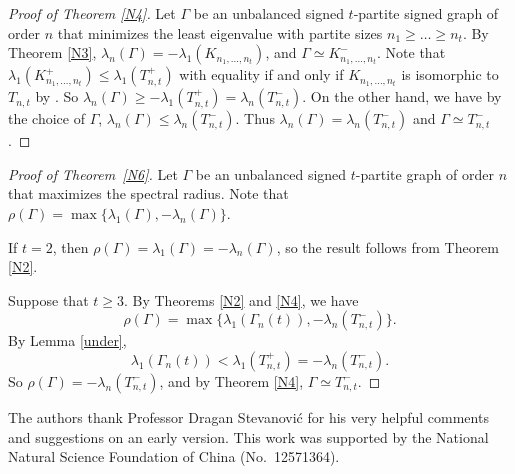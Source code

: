 \documentclass[12pt]{article}
\numberwithin{equation}{section}
\begin{document}
\begin{proof}[Proof of Theorem \ref{N4}]
Let $\Gamma$ be an unbalanced signed $t$-partite signed graph of order $n$ that minimizes the least eigenvalue with partite sizes $n_1\ge \dots\ge n_t$. 
By Theorem \ref{N3}, $\lambda_n(\Gamma)=-\lambda_1(K_{n_1, \dots, n_t})$, and $\Gamma\simeq K_{n_1, \dots, n_t}^-$. 
Note that $\lambda_1(K_{n_1, \dots, n_t}^+)\le \lambda_1(T_{n, t}^+)$ with equality if and only if $K_{n_1, \dots, n_t}$ is isomorphic to $T_{n, t}$ by \cite{SGR}.
So $\lambda_n(\Gamma)\ge -\lambda_1(T_{n, t}^+)=\lambda_n(T_{n, t}^-)$. On the other hand, we have by the choice of $\Gamma$,  $\lambda_n(\Gamma)\le \lambda_n(T_{n, t}^-)$.
Thus $\lambda_n(\Gamma)=\lambda_n(T_{n, t}^-)$ and $\Gamma\simeq T_{n, t}^-$.
\end{proof}




\begin{proof}[Proof of Theorem~\ref{N6}]
Let $\Gamma$ be an unbalanced signed $t$-partite graph of order $n$ that maximizes the spectral radius. Note that $\rho(\Gamma)=\max\{\lambda_1(\Gamma), -\lambda_n(\Gamma)\}$. 

If $t=2$, then  $\rho(\Gamma)=\lambda_1(\Gamma)=-\lambda_n(\Gamma)$, so the result follows from Theorem \ref{N2}. 

Suppose  that $t\ge 3$. 
By Theorems \ref{N2} and \ref{N4}, we have \[
\rho(\Gamma)=\max\{\lambda_1(\Gamma_n(t)), -\lambda_n(T_{n, t}^-)\}.
\]
By Lemma \ref{under},  
\[
\lambda_1(\Gamma_n(t))<\lambda_1(T_{n, t}^+)=-\lambda_n(T_{n, t}^-). 
\]
So $\rho(\Gamma)=-\lambda_n(T_{n, t}^-)$, and by Theorem \ref{N4}, $\Gamma\simeq T_{n, t}^-$. 
\end{proof}


\bigskip

The authors thank Professor Dragan Stevanovi\'{c} for his very  helpful comments and suggestions on an early version. 
This work was supported by the National Natural Science Foundation of China (No.~12571364).
\end{document}
